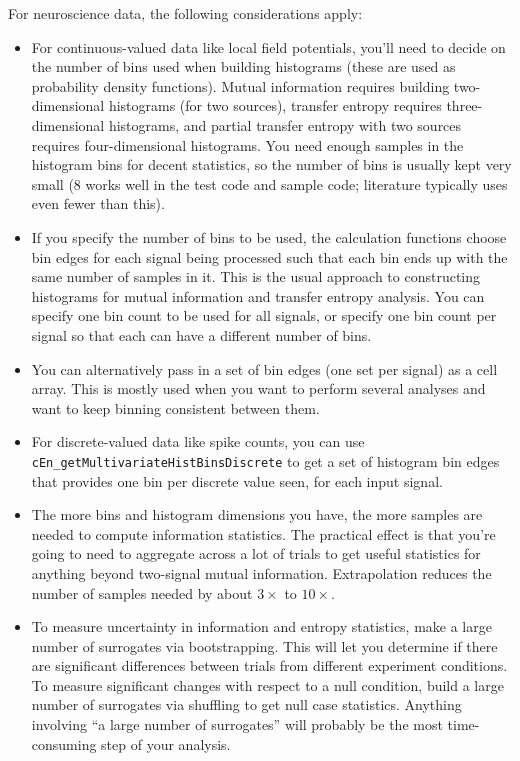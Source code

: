 \clearpage
For neuroscience data, the following considerations apply:
%
\begin{itemize}
%
\item For continuous-valued data like local field potentials, you'll need
to decide on the number of bins used when building histograms (these are
used as probability density functions). Mutual information requires building
two-dimensional histograms (for two sources), transfer entropy requires
three-dimensional histograms, and partial transfer entropy with two sources
requires four-dimensional histograms. You need enough samples in the
histogram bins for decent statistics, so the number of bins is usually kept
very small (8 works well in the test code and sample code; literature
typically uses even fewer than this).
%
\item If you specify the number of bins to be used, the calculation
functions choose bin edges for each signal being processed such that each
bin ends up with the same number of samples in it. This is the usual
approach to constructing histograms for mutual information and transfer
entropy analysis. You can specify one bin count to be used for all signals,
or specify one bin count per signal so that each can have a different
number of bins.
%
\item You can alternatively pass in a set of bin edges (one set per signal)
as a cell array. This is mostly used when you want to perform several
analyses and want to keep binning consistent between them.
%
\item For discrete-valued data like spike counts, you can use
\verb|cEn_getMultivariateHistBinsDiscrete| to get a set of histogram bin
edges that provides one bin per discrete value seen, for each input signal.
%
\item The more bins and histogram dimensions you have, the more samples are
needed to compute information statistics. The practical effect is that
you're going to need to aggregate across a lot of trials to get useful
statistics for anything beyond two-signal mutual information. Extrapolation
reduces the number of samples needed by about $3\times$ to $10\times$.
%
\item To measure uncertainty in information and entropy statistics, make a
large number of surrogates via bootstrapping. This will let you determine if
there are significant differences between trials from different experiment
conditions. To measure significant changes with respect to a null condition,
build a large number of surrogates via shuffling to get null case statistics.
Anything involving ``a large number of surrogates'' will probably be the
most time-consuming step of your analysis.
%
\end{itemize}

%
